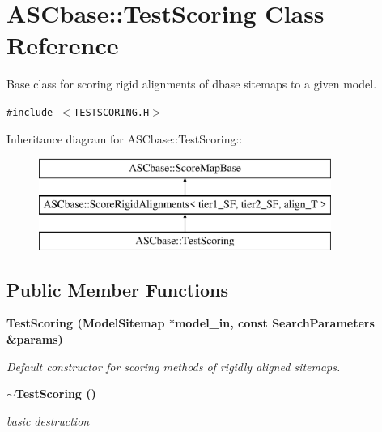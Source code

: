 \section{ASCbase::Test\-Scoring Class Reference}
\label{classASCbase_1_1TestScoring}
Base class for scoring rigid alignments of dbase sitemaps to a given model.  


{\tt \#include $<$TESTSCORING.H$>$}

Inheritance diagram for ASCbase::Test\-Scoring::\begin{figure}[H]
\begin{center}
\leavevmode
\includegraphics[height=3cm]{classASCbase_1_1TestScoring}
\end{center}
\end{figure}
\subsection*{Public Member Functions}
\begin{CompactItemize}
\item 
\bf{Test\-Scoring} (\bf{Model\-Sitemap} $\ast$model\_\-in, const \bf{Search\-Parameters} \&params)
\begin{CompactList}\small\item\em Default constructor for scoring methods of rigidly aligned sitemaps. \item\end{CompactList}\item 
\bf{$\sim$Test\-Scoring} ()\label{classASCbase_1_1TestScoring_47bf11af16fb49567855096808ec8a7f}

\begin{CompactList}\small\item\em basic destruction \item\end{CompactList}\end{CompactItemize}
